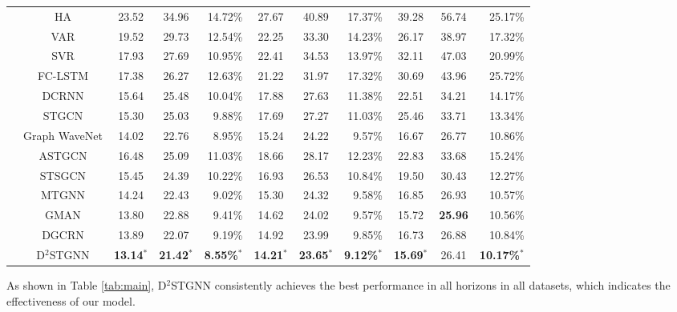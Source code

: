 \documentclass[sigconf, nonacm]{acmart}
\begin{document}
\begin{table*}[p]
\begin{tabular}{ccccr|ccr|ccr}
        \midrule
    \hline
    \color{black}{\multirow{14}*{\textbf{PEMS08}}}
      &HA              & 23.52  & 34.96  & 14.72\%        & 27.67  & 40.89  & 17.37\%       & 39.28  & 56.74  & 25.17\% \\ 
      &VAR             & 19.52  & 29.73  & 12.54\%        & 22.25  & 33.30  & 14.23\%        & 26.17  & 38.97  & 17.32\% \\ 
      &SVR             & 17.93  & 27.69  & 10.95\%        & 22.41  & 34.53  & 13.97\%       & 32.11  & 47.03  & 20.99\% \\ 
      &FC-LSTM         & 17.38  & 26.27  & 12.63\%        & 21.22  & 31.97  & 17.32\%       & 30.69  & 43.96  & 25.72\% \\ 
      &DCRNN           & 15.64  & 25.48  & 10.04\%        & 17.88  & 27.63  & 11.38\%       & 22.51  & 34.21  & 14.17\% \\ 
      &STGCN           & 15.30  & 25.03  &  9.88\%        & 17.69  & 27.27  & 11.03\%       & 25.46  & 33.71  & 13.34\% \\ 
      &Graph WaveNet   & 14.02  & 22.76  &  8.95\%        & 15.24  & 24.22  &  9.57\%       & 16.67  & 26.77  & 10.86\% \\
      &ASTGCN          & 16.48  & 25.09  & 11.03\%        & 18.66  & 28.17  & 12.23\%       & 22.83  & 33.68  & 15.24\% \\  
      &STSGCN          & 15.45  & 24.39  & 10.22\%        & 16.93  & 26.53  & 10.84\%       & 19.50  & 30.43  & 12.27\% \\  
      &MTGNN           & 14.24  & 22.43  &  9.02\%        & 15.30  & 24.32  &  9.58\%       & 16.85  & 26.93  & 10.57\% \\  
      &GMAN            & 13.80  & 22.88  &  9.41\%        & 14.62  & 24.02  &  9.57\%       & 15.72  & \textbf{25.96}  & 10.56\% \\  
      &DGCRN           & 13.89  & 22.07  &  9.19\%        & 14.92  & 23.99  & 9.85\%       & 16.73  & 26.88  & 10.84\% \\  
    \cmidrule(r){2-11}
      &D$^2$STGNN      & \textbf{13.14}$^*$  & \textbf{21.42}$^*$  & \textbf{8.55\%}$^*$        & \textbf{14.21}$^*$  & \textbf{23.65}$^*$  & \textbf{9.12\%}$^*$      & \textbf{15.69}$^*$  & 26.41  & \textbf{10.17\%}$^*$ \\ 
\midrule  
      \bottomrule
    \end{tabular}
\end{table*} As shown in Table \ref{tab:main}, D$^2$STGNN consistently achieves the best performance in all horizons in all datasets, which indicates the effectiveness of our model.
\end{document}
